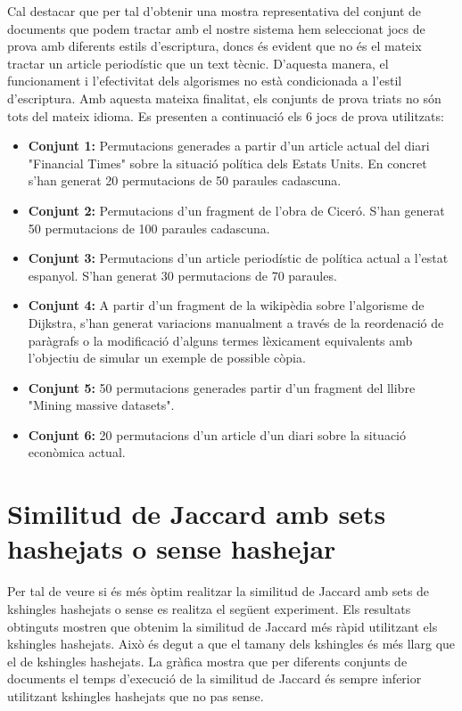 \documentclass[catalan, 12pt]{report}
\begin{document}
Cal destacar que per tal d'obtenir una mostra representativa del conjunt de documents que podem tractar amb el nostre sistema hem seleccionat jocs de prova amb diferents estils d'escriptura, doncs és evident que no és el mateix tractar un article periodístic que un text tècnic. D'aquesta manera, el funcionament i l'efectivitat dels algorismes no està condicionada a l'estil d'escriptura. Amb aquesta mateixa finalitat, els conjunts de prova triats no són tots del mateix idioma. Es presenten a continuació els 6 jocs de prova utilitzats: \newline

\begin{itemize}
\item \textbf{Conjunt 1:} Permutacions generades a partir d'un article actual del diari "Financial Times" sobre la situació política dels Estats Units. En concret s'han generat 20 permutacions de 50 paraules cadascuna.

\item \textbf{Conjunt 2:} Permutacions d'un fragment de l'obra de Ciceró. S'han generat 50 permutacions de 100 paraules cadascuna.

\item \textbf{Conjunt 3:} Permutacions d'un article periodístic de política actual a l'estat espanyol. S'han generat 30 permutacions de 70 paraules.

\item \textbf{Conjunt 4:} A partir d'un fragment de la wikipèdia sobre l'algorisme de Dijkstra, s'han generat variacions manualment a través de la reordenació de paràgrafs o la modificació d'alguns termes lèxicament equivalents amb l'objectiu de simular un exemple de possible còpia.

\item \textbf{Conjunt 5:} 50 permutacions generades partir d'un fragment del llibre "Mining massive datasets".

\item \textbf{Conjunt 6:} 20 permutacions d'un article d'un diari sobre la situació econòmica actual.
\end{itemize}

\section{Similitud de Jaccard amb sets hashejats o sense hashejar}

Per tal de veure si és més òptim realitzar la similitud de Jaccard amb sets de kshingles hashejats o sense es realitza el següent experiment. Els resultats obtinguts mostren que obtenim la similitud de Jaccard més ràpid utilitzant els kshingles hashejats. Això és degut a que el tamany dels kshingles és més llarg que el de kshingles hashejats. La gràfica mostra que per diferents conjunts de documents el temps d'execució de la similitud de Jaccard és sempre inferior utilitzant kshingles hashejats que no pas sense.
\end{document}
